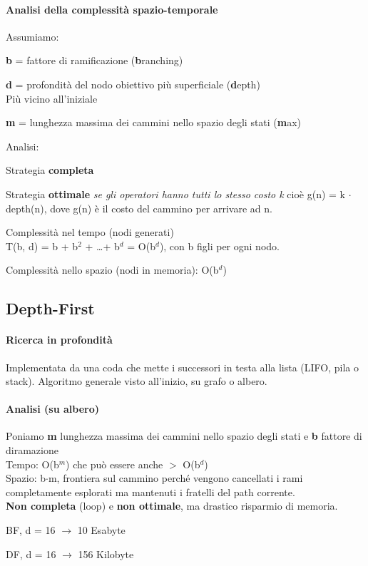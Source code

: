 \documentclass[10pt]{book}
\begin{document}
\paragraph{Analisi della complessità spazio-temporale} Assumiamo:
\begin{list}{}{}
	\item \textbf{b} = fattore di ramificazione (\textbf{b}ranching)
	\item \textbf{d} = profondità del nodo obiettivo più superficiale (\textbf{d}epth)\\
	Più vicino all'iniziale
	\item \textbf{m} = lunghezza massima dei cammini nello spazio degli stati (\textbf{m}ax)
\end{list}
Analisi:
\begin{list}{}{}
	\item Strategia \textbf{completa}
	\item Strategia \textbf{ottimale} \textit{se gli operatori hanno tutti lo stesso costo k} cioè g(n) = k $\cdot$ depth(n), dove g(n) è il costo del cammino per arrivare ad n.
	\item Complessità nel tempo (nodi generati)\\
	T(b, d) = b + b$^2$ + \ldots + b$^d$ = O(b$^d$), con b figli per ogni nodo.
	\item Complessità nello spazio (nodi in memoria): O(b$^d$)
\end{list}
\pagebreak
\subsection{Depth-First}
\paragraph{Ricerca in profondità} Implementata da una coda che mette i successori in testa alla lista (LIFO, pila o stack). Algoritmo generale visto all'inizio, su grafo o albero.
\paragraph{Analisi (su albero)} Poniamo \textbf{m} lunghezza massima dei cammini nello spazio degli stati e \textbf{b} fattore di diramazione\\
Tempo: O(b$^m$) che può essere anche $>$ O(b$^d$)\\
Spazio: b$\cdot$m, frontiera sul cammino perché vengono cancellati i rami completamente esplorati ma mantenuti i fratelli del path corrente.\\
\textbf{Non completa} (loop) e \textbf{non ottimale}, ma drastico risparmio di memoria.
\begin{list}{}{}
	\item BF, d = 16 $\rightarrow$ 10 Esabyte
	\item DF, d = 16 $\rightarrow$ 156 Kilobyte
\end{list}
\end{document}

